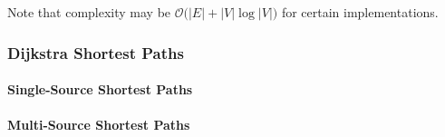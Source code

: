 Note that complexity may be $\mathcal{O}(|E| + |V|\log{|V|)}$ for certain implementations.

\subsubsection{Dijkstra Shortest Paths}

\paragraph{Single-Source Shortest Paths}
{\small
      
}

\paragraph{Multi-Source Shortest Paths}
{\small
      
}

